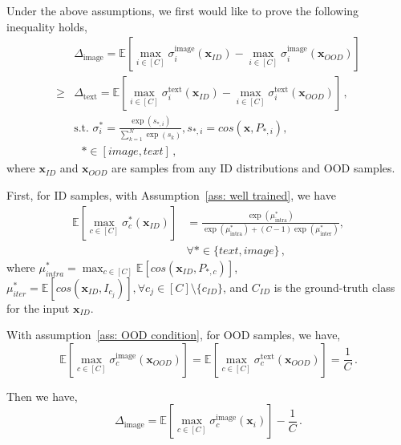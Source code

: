 Under the above assumptions, we first would like to prove the following inequality holds,
\begin{equation}
    \begin{aligned}
        &  \Delta_{\text{image}}=\mathbb{E}\left[\max_{i \in [C]} \sigma_i^{\text{image}}(\mathbf{x}_{\textit{ID}}) - \max_{i \in [C]} \sigma_i^{\text{image}}(\mathbf{x}_{\textit{OOD}})\right] \\
        \geq &  \Delta_{\text{text}}=\mathbb{E}\left[\max_{i \in [C]} \sigma_i^{\text{text}}(\mathbf{x}_{\textit{ID}}) - \max_{i \in [C]} \sigma_i^{\text{text}}(\mathbf{x}_{\textit{OOD}})\right]\,, \\
        & \text{s.t. } \sigma_i^{*} = \frac{\exp(s_{*,i})}{\sum_{k=1}^{N} \exp(s_k)}, s_{*,i} = cos(\mathbf{x}, P_{*,i}), \\
        & \ \ \ * \in [\textit{image}, \textit{text}] \,,
    \end{aligned}
\end{equation}
where $\mathbf{x}_{\textit{ID}}$ and $\mathbf{x}_{\textit{OOD}}$ are samples from any ID distributions and OOD samples.

First, for ID samples, with Assumption~\ref{ass: well trained}, we have
\begin{equation}
    \begin{aligned}
        \mathbb{E}\left[\max_{c\in[C]}\sigma_{c}^{*}(\mathbf{x}_{\textit{ID}})\right] &= \frac{\exp\left(\mu_{\text{intra}}^{*}\right)}{\exp\left(\mu_{\text{intra}}^{*}\right) + (C-1) \exp\left(\mu_{\text{inter}}^{*}\right)}, \\
        &\forall * \in \{\textit{text}, \textit{image}\}\,,
    \end{aligned}
\end{equation}
where $\mu_{\textit{intra}}^{*} = \max_{c\in[C]}\mathbb{E}[cos(\mathbf{x}_{\textit{ID}}, P_{*,c})]$, $\mu_{iter}^{*} = \mathbb{E}[cos(\mathbf{x}_{\textit{ID}}, I_{c_j})], \forall c_j \in [C] \setminus \{c_{\textit{ID}}\}$, and $C_{\textit{ID}}$ is the ground-truth class for the input $\mathbf{x}_{\textit{ID}}$.

With assumption~\ref{ass: OOD condition}, for OOD samples, we have,
\begin{equation}
    \mathbb{E}\left[\max_{c \in [C]} \sigma_c^{\text{image}}(\mathbf{x}_{\textit{OOD}})\right] = \mathbb{E}\left[\max_{c \in [C]} \sigma_c^{\text{text}}(\mathbf{x}_{\textit{OOD}})\right] = \frac{1}{C}\,.  
\end{equation}

Then we have,
\begin{equation}
    \Delta_{\text{image}} = \mathbb{E}\left[\max_{c\in[C]}\sigma_{c}^{\text{image}}(\mathbf{x}_i)\right] - \frac{1}{C}\,.
\end{equation}

